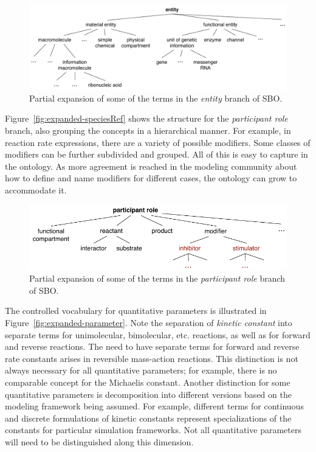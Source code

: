 \begin{figure}[htb]
  \centering
  \vspace*{-1ex}
  \includegraphics[scale = 0.78]{figs/sbo-entity}
  \caption{Partial expansion of some of the terms in the
    \emph{entity} branch of SBO.}
  \label{fig:expanded-species}
\end{figure}

Figure~\vref{fig:expanded-speciesRef} shows the structure for the
\emph{participant role} branch, also grouping the concepts in a
hierarchical manner.  For example, in reaction rate expressions,
there are a variety of possible modifiers.  Some classes of
modifiers can be further subdivided and grouped.  All of this is
easy to capture in the ontology.  As more agreement is reached in
the modeling community about how to define and name modifiers for
different cases, the ontology can grow to accommodate it.

\begin{figure}[htb]
  \centering
  \includegraphics[scale = 0.87]{figs/sbo-participant-role}
  \caption{Partial expansion of some of the terms in the
    \emph{participant role} branch of SBO.}
  \label{fig:expanded-speciesRef}
\end{figure}

The controlled vocabulary for quantitative parameters is
illustrated in Figure~\vref{fig:expanded-parameter}.  Note the
separation of \emph{kinetic constant} into separate terms for
unimolecular, bimolecular, etc. reactions, as well as for forward
and reverse reactions.  The need to have separate terms for
forward and reverse rate constants arises in reversible
mass-action reactions.  This distinction is not always necessary
for all quantitative parameters; for example, there is no
comparable concept for the Michaelis constant.  Another
distinction for some quantitative parameters is decomposition into
different versions based on the modeling framework being assumed.
For example, different terms for continuous and discrete
formulations of kinetic constants represent specializations of the
constants for particular simulation frameworks.  Not all
quantitative parameters will need to be distinguished along this
dimension.

